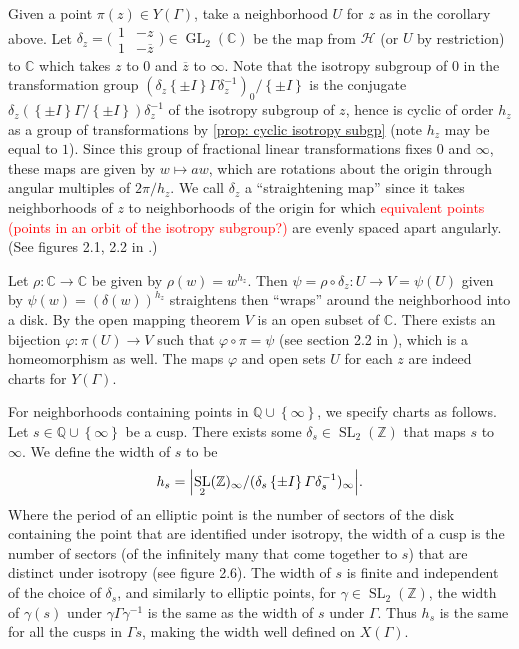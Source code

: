 \documentclass[10pt,leqno,twoside]{article}
\theoremstyle{plain}
\theoremstyle{definition}
\numberwithin{equation}{section}
\numberwithin{lem}{section}
\newcommand{\cbr}[1]{\left\{#1\right\}}
\DeclareMathOperator{\GL}{GL}
\DeclareMathOperator{\SL}{SL}
\newcommand{\slz}{\SL_2(\mathbb{Z})}
\newcommand{\sai}[1]{\textcolor{red}{#1}}
\begin{document}
Given a point $\pi(z)\in Y(\varGamma)$, take a neighborhood $U$ for $z$ as in the corollary above. Let $\delta_z  = \big(\!\begin{smallmatrix}
    1 & -z \\ 1 & -\overline{z}
\end{smallmatrix}\!\big)\in \GL_2(\mathbb C)$ be the map from $\mathcal H$ (or $U$ by restriction) to $\mathbb C$ which takes $z$ to $0$ and $\overline{z}$ to $\infty$. Note that the isotropy subgroup of $0$ in the transformation group $(\delta_z\cbr{\pm I}\varGamma\delta_z^{-1})_0/\cbr{\pm I}$ is the conjugate $\delta_z(\cbr{\pm I}\varGamma/\cbr{\pm I})\delta_z^{-1}$ of the isotropy subgroup of $z$, hence is cyclic of order $h_z$ as a group of transformations by \cref{prop: cyclic isotropy subgp} (note $h_z$ may be equal to $1$). Since this group of fractional linear transformations fixes $0$ and $\infty$, these maps are given by $w\mapsto aw$, which are rotations about the origin through angular multiples of $2\pi/h_z$. We call $\delta_z$ a ``straightening map'' since it takes neighborhoods of $z$ to neighborhoods of the origin for which \sai{equivalent points (points in an orbit of the isotropy subgroup?)} are evenly spaced apart angularly. (See figures 2.1, 2.2 in \cite{diamond}.)

Let $\rho\colon \mathbb C\to \mathbb C$ be given by $\rho(w) = w^{h_z}$. Then $\psi = \rho\circ \delta_z \colon U\to V = \psi(U)$ given by $\psi(w) = (\delta(w))^{h_z}$ straightens then ``wraps'' around the neighborhood into a disk. By the open mapping theorem $V$ is an open subset of $\mathbb C$. There exists an bijection $\varphi\colon \pi(U)\to V$ such that $\varphi\circ\pi = \psi$ (see section 2.2 in \cite{diamond}), which is a homeomorphism as well. The maps $\varphi$ and open sets $U$ for each $z$ are indeed charts for $Y(\varGamma)$.

For neighborhoods containing points in $\mathbb Q\cup\cbr{\infty}$, we specify charts as follows. Let $s\in\mathbb Q\cup\cbr{\infty}$ be a cusp. There exists some $\delta_s\in\slz$ that maps $s$ to $\infty$. We define the width of $s$ to be 
\[h_s = \abs{\slz_\infty/(\delta_s\cbr{\pm I}\varGamma\delta_s^{-1})_\infty}.\] Where the period of an elliptic point is the number of sectors of the disk containing the point that are identified under isotropy, the width of a cusp is the number of sectors (of the infinitely many that come together to $s$) that are distinct under isotropy (see \cite{diamond} figure 2.6). The width of $s$ is finite and independent of the choice of $\delta_s$, and similarly to elliptic points, for $\gamma\in\slz$, the width of $\gamma(s)$ under $\gamma\varGamma\gamma^{-1}$ is the same as the width of $s$ under $\varGamma$. Thus $h_s$ is the same for all the cusps in $\varGamma s$, making the width well defined on $X(\varGamma)$.
\end{document}
